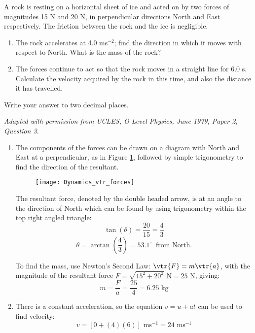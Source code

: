 
\begin{problem}[O1979PIIQ3a]
{A rock is resting on a horizontal sheet of ice and acted on by two forces of magnitudes 15 N and 20 N, in perpendicular directions North and East respectively. The friction between the rock and the ice is negligible.
\begin{enumerate}
	\item The rock accelerates at 4.0 ms$^{-2}$; find the direction in which it moves with respect to North. What is the mass of the rock?   
	\item The forces continue to act so that the rock moves in a straight line for 6.0 s. Calculate the velocity acquired by the rock in this time, and also the distance it has travelled.   
\end{enumerate}
Write your answer to two decimal places.}
{\textit{Adapted with permission from UCLES, O Level Physics, June 1979, Paper 2, Question 3.}}
{\begin{enumerate}
	\item The components of the forces can be drawn on a diagram with North and East at a perpendicular, as in Figure \ref{fig:Dynamics_vtr_forces}, followed by simple trigonometry to find the direction of the resultant. 
\begin{figure}[h]
	\centering
	\texttt{[image: Dynamics\_vtr\_forces]}
	\caption{}
	\label{fig:Dynamics_vtr_forces}
\end{figure}

The resultant force, denoted by the double headed arrow, is at an angle to the direction of North which can be found by using trigonometry within the top right angled triangle:
	\begin{equation*}\tan(\theta)=\frac{20}{15} = \frac{4}{3} \end{equation*}
	\begin{equation*}\theta = \arctan\left(\frac{4}{3}\right) = 53.1^{\circ} \:\textrm{ from North.}\end{equation*}

To find the mass, use Newton's Second Law: $\vtr{F} = m\vtr{a}$, with the magnitude of the resultant force $F = \sqrt{15^{2} + 20^{2}} \textrm{ N} = 25 \textrm{ N}$, giving: 
\begin{equation*}m = \frac{F}{a} = \frac{25}{4} = 6.25 \textrm{ kg} \end{equation*}
	\item There is a constant acceleration, so the equation $v = u + at$ can be used to find velocity: 
	\begin{equation*} v = [0 + (4)(6)] \textrm{ ms}^{-1} = 24 \textrm{ ms}^{-1} \end{equation*}


\end{enumerate}}
\end{problem}

